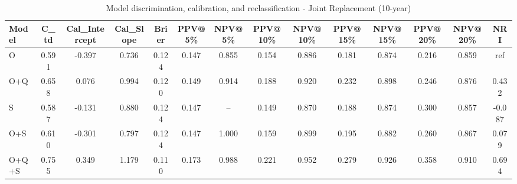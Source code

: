 \begin{table}[htbp]
\centering
\small
\caption{Model discrimination, calibration, and reclassification - Joint Replacement (10-year)}
\label{tab:perf_joint_10y}
\begin{tabular}{lccccccccccccc}
\toprule
Model & C\_td & Cal\_Intercept & Cal\_Slope & Brier & PPV@5\% & NPV@5\% & PPV@10\% & NPV@10\% & PPV@15\% & NPV@15\% & PPV@20\% & NPV@20\% & NRI \\
\midrule
O & 0.591 & -0.397 & 0.736 & 0.124 & 0.147 & 0.855 & 0.154 & 0.886 & 0.181 & 0.874 & 0.216 & 0.859 & ref \\
O+Q & 0.658 & 0.076 & 0.994 & 0.120 & 0.149 & 0.914 & 0.188 & 0.920 & 0.232 & 0.898 & 0.246 & 0.876 & 0.432 \\
S & 0.587 & -0.131 & 0.880 & 0.124 & 0.147 & -- & 0.149 & 0.870 & 0.188 & 0.874 & 0.300 & 0.857 & -0.087 \\
O+S & 0.610 & -0.301 & 0.797 & 0.124 & 0.147 & 1.000 & 0.159 & 0.899 & 0.195 & 0.882 & 0.260 & 0.867 & 0.079 \\
O+Q+S & 0.755 & 0.349 & 1.179 & 0.110 & 0.173 & 0.988 & 0.221 & 0.952 & 0.279 & 0.926 & 0.358 & 0.910 & 0.694 \\
\bottomrule
\end{tabular}
\end{table}